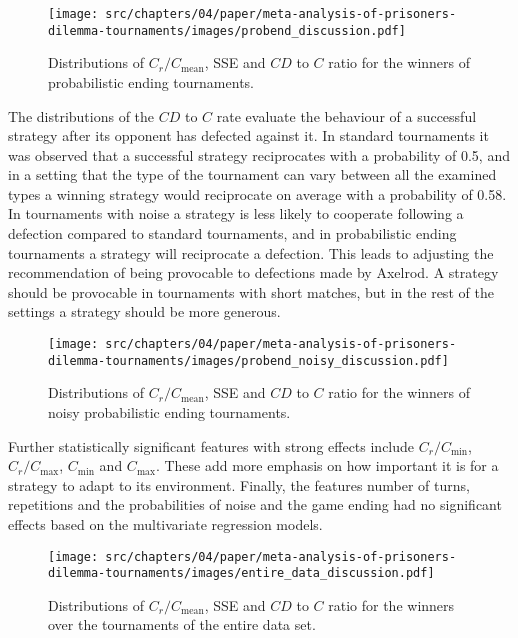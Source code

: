 \begin{figure}[!htbp]
    \centering
        \centering
        \texttt{[image: src/chapters/04/paper/meta-analysis-of-prisoners-dilemma-tournaments/images/probend\_discussion.pdf]}
        \caption{Distributions of \(C_r / C_{\text{mean}}\), SSE and \(CD\) to \(C\) ratio
        for the winners of probabilistic ending tournaments.}
        \label{fig:discussion_probend}
\end{figure}

The distributions of the \(CD\) to \(C\) rate evaluate the behaviour of a
successful strategy after its opponent has defected against it. In standard
tournaments it was observed that a successful strategy reciprocates with a
probability of 0.5, and in a setting that the type
of the tournament can vary between all the examined types a winning strategy
would reciprocate on average with a probability of 0.58. In
tournaments with noise a strategy is less likely to cooperate following a
defection compared to standard tournaments, and in probabilistic ending
tournaments a strategy will reciprocate a defection.
This leads to adjusting the recommendation of being provocable to defections made
by Axelrod. A strategy should be provocable in tournaments with short matches,
but in the rest of the settings a strategy should be more generous.

\begin{figure}[!htbp]
    \centering
        \centering
        \texttt{[image: src/chapters/04/paper/meta-analysis-of-prisoners-dilemma-tournaments/images/probend\_noisy\_discussion.pdf]}
        \caption{Distributions of \(C_r / C_{\text{mean}}\), SSE and \(CD\) to \(C\) ratio
        for the winners of noisy probabilistic ending tournaments.}
        \label{fig:discussion_probend_noisy}
\end{figure}

Further statistically significant features with strong effects include \(C_r /
C_{\text{min}}\), \(C_r / C_{\text{max}}\), \(C_{\text{min}}\) and
\(C_{\text{max}}\). These add more emphasis on how important it is for a
strategy to adapt to its environment. Finally, the features number of turns,
repetitions and the probabilities of noise and the game ending had no
significant effects based on the multivariate regression models.

\begin{figure}[!htbp]
    \centering
        \centering
        \texttt{[image: src/chapters/04/paper/meta-analysis-of-prisoners-dilemma-tournaments/images/entire\_data\_discussion.pdf]}
        \caption{Distributions of \(C_r / C_{\text{mean}}\), SSE and \(CD\) to \(C\) ratio
        for the winners over the tournaments of the entire data set.}
        \label{fig:discussion_entire_data}
\end{figure}

